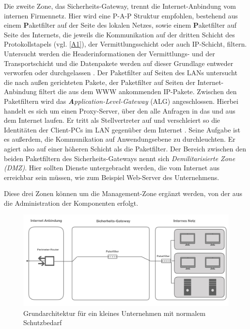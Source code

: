 Die zweite Zone, das Sicherheits-Gateway, trennt die Internet-Anbindung vom internen Firmennetz. Hier wird eine P-A-P Struktur empfohlen, bestehend aus einem \textbf{P}aketfilter auf der Seite des lokalen Netzes, sowie einem \textbf{P}aketfilter auf Seite des Internets, die jeweils die Kommunikation auf der dritten Schicht des Protokollstapels (vgl. \ref{A1}), der Vermittlungsschicht oder auch IP-Schicht, filtern. Untersucht werden die Headerinformationen der Vermittlungs- und der Transportschicht und die Datenpakete werden auf dieser Grundlage entweder verworfen oder durchgelassen  \cite{isi-lana}.
 Der Paketfilter auf Seiten des LANs untersucht die nach außen gerichteten Pakete, der Paketfilter auf Seiten der Internet-Anbindung filtert die aus dem WWW ankommenden IP-Pakete. Zwischen den Paketfiltern wird das \emph{\textbf{A}pplication-Level-Gateway} (ALG) angeschlossen. Hierbei handelt es sich um einen Proxy-Server, über den alle Anfragen in das und aus dem Internet laufen. Er tritt als Stellvertreter auf und verschleiert so die Identitäten der  Client-PCs im LAN gegenüber dem Internet \cite{zisler2018computer}. Seine Aufgabe ist es außerdem, die Kommunikation auf Anwendungsebene zu durchleuchten. Er agiert also auf einer höheren Schicht als die Paketfilter. 
 Der Bereich zwischen den beiden Paketfiltern des Sicherheits-Gateways nennt sich \emph{Demilitarisierte Zone (DMZ)}. Hier sollten Dienste untergebracht werden, die vom Internet aus erreichbar sein müssen, wie zum Beispiel Web-Server des Unternehmens. 
 
Diese drei Zonen können um die Management-Zone ergänzt werden, von der aus die Administration der Komponenten erfolgt.
\begin{figure}
	\includegraphics[width=\linewidth]{klUnternHoch.jpeg}
	\caption{Grundarchitektur für ein kleines Unternehmen mit normalem Schutzbedarf}
	\label{klUnorm}
\end{figure}

